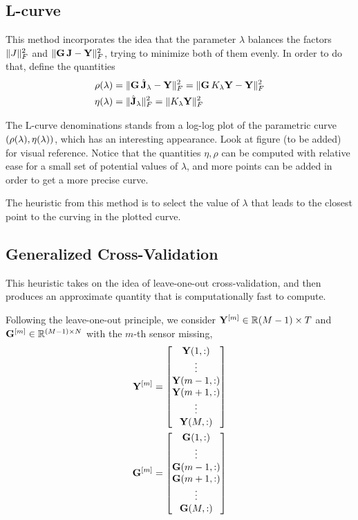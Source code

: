 \subsection{L-curve}

This method incorporates the idea that the parameter $\lambda$ balances the factors $\lVert J \rVert_F^2$ and $\lVert \mathbf{G}\, \mathbf{J} - \mathbf{Y} \rVert_F^2$, trying to minimize both of them evenly.
%
In order to do that, define the quantities
\begin{align}
\rho(\lambda)
&=
\lVert \mathbf{G}\, \hat{\mathbf{J}}_\lambda - \mathbf{Y} \rVert_F^2
=
\lVert \mathbf{G}\, K_\lambda\mathbf{Y} - \mathbf{Y} \rVert_F^2
\\
\eta(\lambda)
&=
\lVert \hat{\mathbf{J}}_\lambda \rVert_F^2 
= 
\lVert  K_\lambda \mathbf{Y}  \rVert_F^2
\end{align}

The L-curve denominations stands from a log-log plot of the parametric curve $\left( \rho(\lambda), \eta(\lambda)  \right)$, which has an interesting appearance.
%
Look at figure (to be added) for visual reference.
%
Notice that the quantities $\eta, \rho$ can be computed with relative ease for a small set of potential values of $\lambda$, and more points can be added in order to get a more precise curve.

The heuristic from this method is to select the value of $\lambda$ that leads to the closest point to the curving in the plotted curve.

\subsection{Generalized Cross-Validation}

This heuristic takes on the idea of leave-one-out cross-validation, and then produces an approximate quantity that is computationally fast to compute.

Following the leave-one-out principle, we consider $\mathbf{Y}^{[m]}\in\mathbb{R}{(M-1)\times T}$ and $\mathbf{G}^{[m]} \in \mathbb{R}^{(M-1)\times N}$ with the $m$-th sensor missing,
\begin{align}
\mathbf{Y}^{[m]} &=
\begin{bmatrix}
\mathbf{Y}(1,:) \\
\vdots \\
\mathbf{Y}(m-1,:) \\
\mathbf{Y}(m+1,:) \\
\vdots \\
\mathbf{Y}(M,:) 
\end{bmatrix}
\\
\mathbf{G}^{[m]} &=
\begin{bmatrix}
\mathbf{G}(1,:) \\
\vdots \\
\mathbf{G}(m-1,:) \\
\mathbf{G}(m+1,:) \\
\vdots \\
\mathbf{G}(M,:) 
\end{bmatrix}
\end{align}

